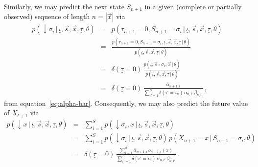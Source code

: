 \documentclass[a4paper]{article}
\newcommand{\dn}{\downarrow\!}
\begin{document}
Similarly, we may predict the next state $S_{n+1}$ in a given (complete or partially observed) sequence of length $n=|\vec{x}|$ via
\begin{eqnarray}
  p(\dn\sigma_i\,|\,\underline{\iota},\vec{s},\vec{x},\underline{\tau},\theta)  
& = &
  p(\tau_{n+1}\!=\!0,S_{n+1}\!=\!\sigma_i\,|\,\underline{\iota},\vec{s},\vec{x},\underline{\tau},\theta) 
\nonumber\\& = &
  \frac{p(\tau_{n+1}\!=\!0,S_{n+1}\!=\!\sigma_i,\underline{\iota},\vec{s},\vec{x},\underline{\tau}\,|\,\theta)}
       {p(\underline{\iota},\vec{s},\vec{x},\underline{\tau}\,|\,\theta)}
\nonumber\\& = & 
  \delta(\underline{\tau}\!=\!0)\,
  \frac{p(\underline{\iota},\vec{s}\circ\sigma_i,\vec{x}\,|\,\theta)}
       {p(\underline{\iota},\vec{s},\vec{x},\underline{\tau}\,|\,\theta)}
\nonumber\\& = & 
  \delta(\underline{\tau}\!=\!0)\,
  \frac{\bar{\alpha}_{n+1,i}}
       {\sum_{i'=1}^S\delta(i'\!=\!i_n)\,\alpha_{n,i'}\,\beta_{n,i'}}
\,,
\end{eqnarray}
from equation~\eqref{eq:alpha-bar}.
Consequently, we may also predict the future value of $X_{t+1}$ via
\begin{eqnarray}
  p(\dn x\,|\,\underline{\iota},\vec{s},\vec{x},\underline{\tau},\theta)  
& = &
\sum_{i=1}^{S}p(\dn \sigma_i,x\,|\,\underline{\iota},\vec{s},\vec{x},\underline{\tau},\theta) 
\nonumber\\& = &
\sum_{i=1}^{S}p(\dn \sigma_i\,|\,\underline{\iota},\vec{s},\vec{x},\underline{\tau},\theta)\,p(X_{n+1}\!=\!x\,|\,S_{n+1}\!=\!\sigma_i,\theta)
\nonumber\\& = &
  \delta(\underline{\tau}\!=\!0)\,
  \frac{\sum_{i=1}^{S}\bar{\alpha}_{n+1,i}\,o_{n+1,i}(x)}
       {\sum_{i'=1}^S\delta(i'\!=\!i_n)\,\alpha_{n,i'}\,\beta_{n,i'}}\,.
\end{eqnarray}
\end{document}
